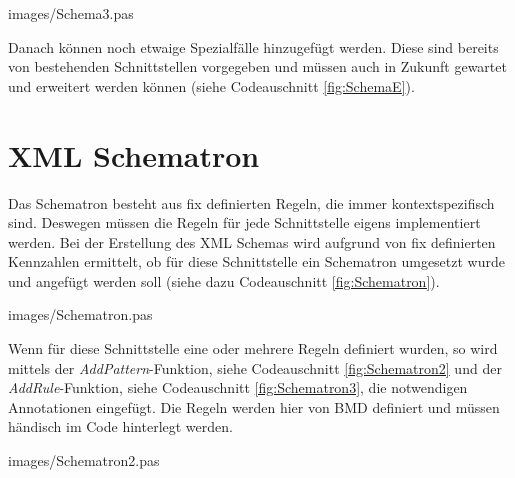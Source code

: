  
\begin{program}
\caption{Behandlung von Spezialfällen (Auszug)}
 \label{fig:SchemaE}
\lstset{language=Pascal, 
        basicstyle=\tiny\ttfamily, 
        numbers=left,
        numberstyle=\tiny, 
        stepnumber=5, 
        firstnumber=0,
        showstringspaces=false}
 {images/Schema3.pas}
\end{program}

Danach können noch etwaige Spezialfälle hinzugefügt werden. Diese sind bereits von bestehenden Schnittstellen vorgegeben und müssen auch in Zukunft gewartet und erweitert werden können (siehe Codeauschnitt \ref{fig:SchemaE}).
 
\section{XML Schematron}
Das Schematron besteht aus fix definierten Regeln, die immer kontextspezifisch sind. 
Deswegen müssen die Regeln für jede Schnittstelle eigens implementiert werden.
Bei der Erstellung des XML Schemas wird aufgrund von fix definierten Kennzahlen ermittelt, ob für diese Schnittstelle ein Schematron umgesetzt wurde und angefügt werden soll (siehe dazu Codeauschnitt \ref{fig:Schematron}).

\begin{program}
\caption{Erstellung des Schematron.}
\label{fig:Schematron}
\lstset{language=Pascal, 
        basicstyle=\tiny\ttfamily, 
        numbers=left,
        numberstyle=\tiny, 
        stepnumber=5, 
        firstnumber=0,
        showstringspaces=false}
 {images/Schematron.pas}
\end{program}

Wenn für diese Schnittstelle eine oder mehrere Regeln definiert wurden, so wird mittels der \emph{AddPattern}-Funktion, siehe Codeauschnitt \ref{fig:Schematron2} und der \emph{AddRule}-Funktion, siehe Codeauschnitt \ref{fig:Schematron3}, die notwendigen Annotationen eingefügt. Die Regeln werden hier von BMD definiert und müssen händisch im Code hinterlegt werden.

\begin{program}
\caption{Erstellung eines Pattern.}
\label{fig:Schematron2}
\lstset{language=Pascal, 
        basicstyle=\tiny\ttfamily, 
        numbers=left,
        numberstyle=\tiny, 
        stepnumber=5, 
        firstnumber=0,
        showstringspaces=false}
 {images/Schematron2.pas}
\end{program}

